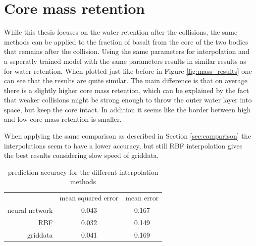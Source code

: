 \chapter{Core mass retention}

While this thesis focuses on the water retention after the collisions, the same methods can be applied to the fraction of basalt from the core of the two bodies that remains after the collision. Using the same parameters for interpolation and a seperatly trained model with the same parameters results in similar results as for water retention. When plotted just like before in Figure \ref{fig:mass_results} one can see that the results are quite similar. The main difference is that on average there is a slightly higher core mass retention, which can be explained by the fact that weaker collisions might be strong enough to throw the outer water layer into space, but keep the core intact. In addition it seems like the border between high and low core mass retention is smaller.

When applying the same comparison as described in Section \ref{sec:comparison} the interpolations seem to have a lower accuracy, but still RBF interpolation gives the best results considering slow speed of griddata.


\begin{table}
	\centering
	\begin{tabular}{rcc}
		& {mean squared error} & {mean error} \\
		neural network &        0.043         &    0.167     \\
		RBF &        0.032         &    0.149     \\
		griddata &        0.041         &   0.169
	\end{tabular}
	\caption{prediction accuracy for the different interpolation methods}
	\label{tab:mass_comparison}
\end{table}

